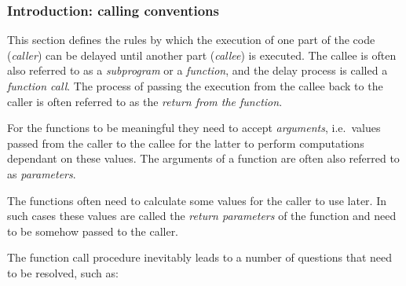 \subsubsection{Introduction: calling conventions}

This section defines the rules by which the execution of one part of the code
(\textit{caller}) can be delayed until another part (\textit{callee})
is executed.
The callee is often also referred to as a \textit{subprogram} or
a \textit{function}, and the delay process is called a \textit{function call}.
The process of passing the execution from the callee back to the caller
is often referred to as the \textit{return from the function}.

For the functions to be meaningful they need to accept \textit{arguments},
i.e.\ values passed from the caller to the callee for the latter to perform
computations dependant on these values.
The arguments of a function are often
also referred to as \textit{parameters}.

The functions often need to calculate some values for the caller to use later.
In such cases these values are called the \textit{return parameters}
of the function and need to be somehow passed to the caller.

The function call procedure inevitably leads to a number of questions that
need to be resolved, such as:

